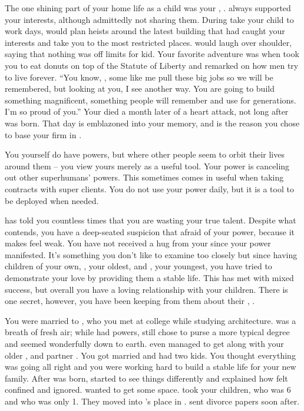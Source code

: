 \documentclass[char]{LRSguildcamp1}
\begin{document}
The one shining part of your home life as a child was your \cGS{\parent}, \cGS{}. \cGS{} always supported your interests, although admittedly not sharing them. During take your child to work days, \cGS{} would plan \cGS{\their} heists around the latest building that had caught your interests and take you to the most restricted places. \cGS{} would laugh over \cGS{\their} shoulder, saying that nothing was off limits for \cGS{\their} kid. Your favorite adventure was when \cGS{\they} took you to eat donuts on top of the Statute of Liberty and remarked on how men try to live forever.  ``You know, \cArchitect{}, some \cGS{\humans} like me pull these big jobs so we will be remembered, but looking at you, I see another way. You are going to build something magnificent, something people will remember and use for generations. I'm so proud of you.'' Your \cGS{\parent} died a month later of a heart attack, not long after \cYoungest{} was born. That day is emblazoned into your memory, and is the reason you chose to base your firm in \pCityArchitect{}.

You yourself do have powers, but where other people seem to orbit their lives around them -- you view yours merely as a useful tool. Your power is canceling out other superhumans' powers. This sometimes comes in useful when taking contracts with super clients. You do not use your power daily, but it is a tool to be deployed when needed.

\cGrandma{} has told you countless times that you are wasting your true talent. Despite what \cGrandma{} contends, you have a deep-seated suspicion that \cGrandma{\theyare} afraid of your power, because it makes \cGrandma{\them} feel weak. You have not received a hug from your \cGrandma{\parent} since your power manifested. It's something you don't like to examine too closely but since having children of your own, \cTeen{}, your oldest, and \cTween{}, your youngest, you have tried to demonstrate your love by providing them a stable life. This has met with mixed success, but overall you have a loving relationship with your children.  There is one secret, however, you have been keeping from them about their \cAS{\parent}, \cAS{}.

You were married to \cAS{}, who you met at college while studying architecture. \cAS{} was a breath of fresh air; while \cAS{\they} had powers, \cAS{\they} still chose to purse a more typical degree and seemed wonderfully down to earth. \cAS{} even managed to get along with your older \cOldest{\sibling}, \cOldest{} and \cOldest{\their} partner \cOS{}. You got married and had two kids. You thought everything was going all right and you were working hard to build a stable life for your new family. After \cTween{} was born, \cAS{} started to see things differently and \cAS{\they} explained how \cAS{\they} felt confined and ignored. \cAS{\They} wanted to get some space.  \cAS{\They} took your children, \cTeen{} who was 6 and \cTween{} who was only 1. They moved into \cOS{}'s place in \pCityO{}. \cAS{} sent divorce papers soon after.
\end{document}
